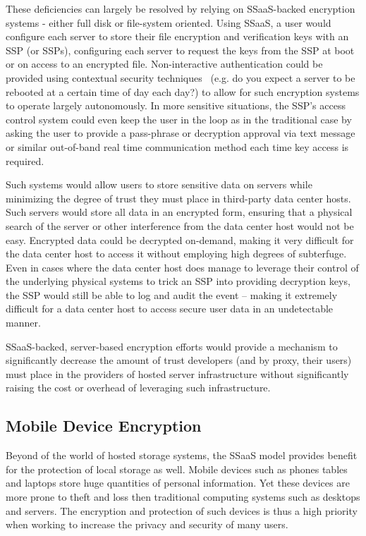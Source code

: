 These deficiencies can largely be resolved by relying on SSaaS-backed
encryption systems - either full disk or file-system oriented. Using
SSaaS, a user would configure each server to store their file
encryption and verification keys with an SSP (or SSPs), configuring
each server to request the keys from the SSP at boot or on access to
an encrypted file. Non-interactive authentication could be provided
using contextual security techniques~\cite{hulsebosch2005} (e.g. do
you expect a server to be rebooted at a certain time of day each day?)
to allow for such encryption systems to operate largely
autonomously. In more sensitive situations, the SSP's access control
system could even keep the user in the loop as in the traditional case
by asking the user to provide a pass-phrase or decryption approval via
text message or similar out-of-band real time communication method
each time key access is required.

Such systems would allow users to store sensitive data on servers
while minimizing the degree of trust they must place in third-party
data center hosts. Such servers would store all data in an encrypted
form, ensuring that a physical search of the server or other
interference from the data center host would not be easy. Encrypted
data could be decrypted on-demand, making it very difficult for the
data center host to access it without employing high degrees of
subterfuge. Even in cases where the data center host does manage to
leverage their control of the underlying physical systems to trick an
SSP into providing decryption keys, the SSP would still be able to log
and audit the event -- making it extremely difficult for a data center
host to access secure user data in an undetectable manner.

SSaaS-backed, server-based encryption efforts would provide a
mechanism to significantly decrease the amount of trust developers
(and by proxy, their users) must place in the providers of hosted
server infrastructure without significantly raising the cost or
overhead of leveraging such infrastructure.

\subsection{Mobile Device Encryption}

Beyond of the world of hosted storage systems, the SSaaS model
provides benefit for the protection of local storage as well. Mobile
devices such as phones tables and laptops store huge quantities of
personal information. Yet these devices are more prone to theft and
loss then traditional computing systems such as desktops and
servers. The encryption and protection of such devices is thus a high
priority when working to increase the privacy and security of many
users.

